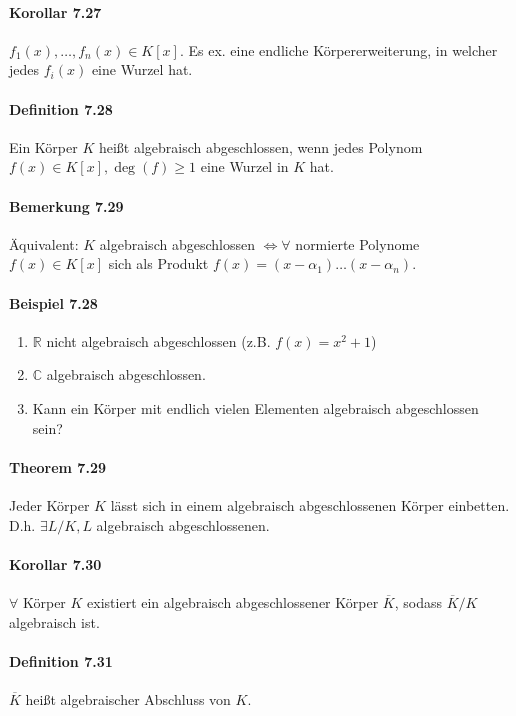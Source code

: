 \documentclass{scrartcl}
\newcommand{\q}[1]{\overline{#1}} %
\newcommand{\R}{\mathbb{R}}
\newcommand{\C}{\mathbb{C}}
\begin{document}
\paragraph{Korollar 7.27}
$f_1(x),\dots,f_n(x)\in K[x]$. Es ex. eine endliche Körpererweiterung, in
welcher jedes $f_i(x)$ eine Wurzel hat.

\paragraph{Definition 7.28}
Ein Körper $K$ heißt algebraisch abgeschlossen, wenn jedes Polynom $f(x)\in
K[x], \deg(f)\geq 1$ eine Wurzel in $K$ hat.

\paragraph{Bemerkung 7.29}
Äquivalent: $K$ algebraisch abgeschlossen $\Leftrightarrow \forall$ normierte
Polynome $f(x)\in K[x]$ sich als Produkt $f(x)=(x-\alpha_1)\dots(x-\alpha_n)$.

\paragraph{Beispiel 7.28}
\begin{enumerate}{}
\item $\R$ nicht algebraisch abgeschlossen (z.B. $f(x)=x^2+1$)
\item $\C$ algebraisch abgeschlossen.
\item Kann ein Körper mit endlich vielen Elementen algebraisch abgeschlossen sein?
\end{enumerate}

\paragraph{Theorem 7.29}
Jeder Körper $K$ lässt sich in einem algebraisch abgeschlossenen Körper
einbetten. D.h. $\exists L/K, L$ algebraisch abgeschlossenen.

\paragraph{Korollar 7.30}
$\forall$ Körper $K$ existiert ein algebraisch abgeschlossener Körper $\q{K}$,
sodass $\q{K}/K$ algebraisch ist.

\paragraph{Definition 7.31}
$\q{K}$ heißt algebraischer Abschluss von $K$.
\end{document}
